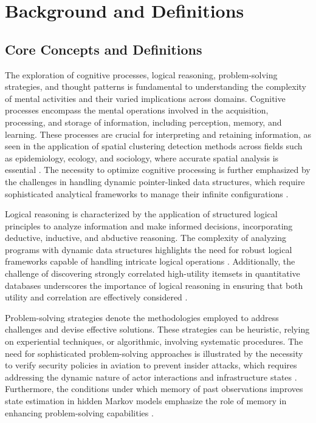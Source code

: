 \section{Background and Definitions} \label{sec:Background and Definitions}



\subsection{Core Concepts and Definitions} \label{subsec:Core Concepts and Definitions}



The exploration of cognitive processes, logical reasoning, problem-solving strategies, and thought patterns is fundamental to understanding the complexity of mental activities and their varied implications across domains. Cognitive processes encompass the mental operations involved in the acquisition, processing, and storage of information, including perception, memory, and learning. These processes are crucial for interpreting and retaining information, as seen in the application of spatial clustering detection methods across fields such as epidemiology, ecology, and sociology, where accurate spatial analysis is essential \cite{vidanapathirana2022clusterdetectioncapabilitiesaverage}. The necessity to optimize cognitive processing is further emphasized by the challenges in handling dynamic pointer-linked data structures, which require sophisticated analytical frameworks to manage their infinite configurations \cite{holk2022lowlevelbiabduction}.



Logical reasoning is characterized by the application of structured logical principles to analyze information and make informed decisions, incorporating deductive, inductive, and abductive reasoning. The complexity of analyzing programs with dynamic data structures highlights the need for robust logical frameworks capable of handling intricate logical operations \cite{holk2022lowlevelbiabduction}. Additionally, the challenge of discovering strongly correlated high-utility itemsets in quantitative databases underscores the importance of logical reasoning in ensuring that both utility and correlation are effectively considered \cite{gan2019correlatedutilitybasedpatternmining}.



Problem-solving strategies denote the methodologies employed to address challenges and devise effective solutions. These strategies can be heuristic, relying on experiential techniques, or algorithmic, involving systematic procedures. The need for sophisticated problem-solving approaches is illustrated by the necessity to verify security policies in aviation to prevent insider attacks, which requires addressing the dynamic nature of actor interactions and infrastructure states \cite{kammller2020applyingisabelleinsiderframework}. Furthermore, the conditions under which memory of past observations improves state estimation in hidden Markov models emphasize the role of memory in enhancing problem-solving capabilities \cite{lathouwers2017memorypaysdiscordhidden}.



